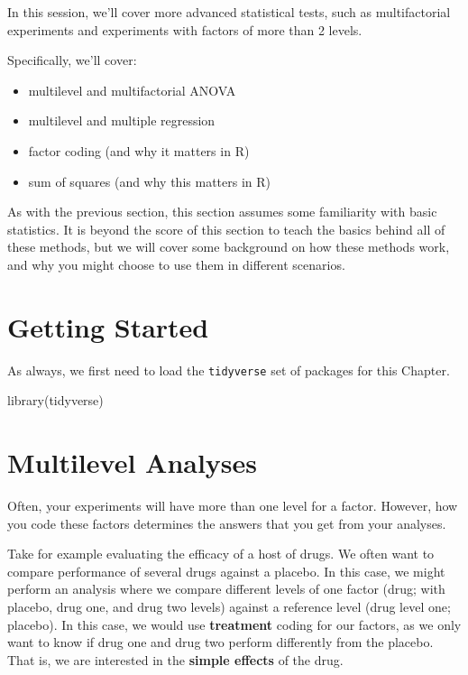 \documentclass[
]{book}
\newenvironment{Shaded}{\begin{snugshade}}{\end{snugshade}}
\newcommand{\FunctionTok}[1]{\textcolor[rgb]{0.00,0.00,0.00}{#1}}
\newcommand{\NormalTok}[1]{#1}
\providecommand{\tightlist}{%
  \setlength{\itemsep}{0pt}\setlength{\parskip}{0pt}}
\begin{document}
In this session, we'll cover more advanced statistical tests, such as multifactorial experiments and experiments with factors of more than 2 levels.

Specifically, we'll cover:

\begin{itemize}
\tightlist
\item
  multilevel and multifactorial ANOVA
\item
  multilevel and multiple regression
\item
  factor coding (and why it matters in R)
\item
  sum of squares (and why this matters in R)
\end{itemize}

As with the previous section, this section assumes some familiarity with basic statistics. It is beyond the score of this section to teach the basics behind all of these methods, but we will cover some background on how these methods work, and why you might choose to use them in different scenarios.

\hypertarget{getting-started-4}{%
\section{Getting Started}\label{getting-started-4}}

As always, we first need to load the \texttt{tidyverse} set of packages for this Chapter.

\begin{Shaded}
\begin{Highlighting}[]
\FunctionTok{library}\NormalTok{(tidyverse)}
\end{Highlighting}
\end{Shaded}

\hypertarget{multilevel-analyses}{%
\section{Multilevel Analyses}\label{multilevel-analyses}}

Often, your experiments will have more than one level for a factor. However, how you code these factors determines the answers that you get from your analyses.

Take for example evaluating the efficacy of a host of drugs. We often want to compare performance of several drugs against a placebo. In this case, we might perform an analysis where we compare different levels of one factor (drug; with placebo, drug one, and drug two levels) against a reference level (drug level one; placebo). In this case, we would use \textbf{treatment} coding for our factors, as we only want to know if drug one and drug two perform differently from the placebo. That is, we are interested in the \textbf{simple effects} of the drug.
\end{document}
